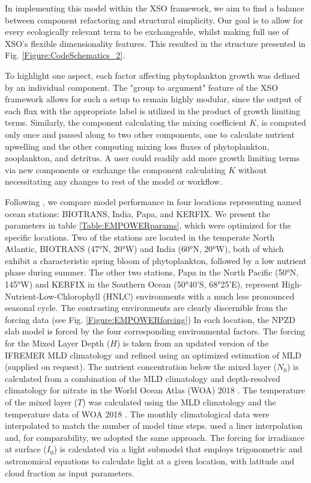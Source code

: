 \documentclass[journal abbreviation, manuscript]{copernicus}
\begin{document}
In implementing this model within the XSO framework, we aim to find a balance between component refactoring and structural simplicity. Our goal is to allow for every ecologically relevant term to be exchangeable, whilst making full use of XSO's flexible dimensionality features. This resulted in the structure presented in Fig. \ref{Figure:CodeSchematics_2}.

To highlight one aspect, each factor affecting phytoplankton growth was defined by an individual component. The "group to argument" feature of the XSO framework allows for such a setup to remain highly modular, since the output of each flux with the appropriate label is utilized in the product of growth limiting terms. 
Similarly, the component calculating the mixing coefficient $K$, is computed only once and passed along to two other components, one to calculate nutrient upwelling and the other computing mixing loss fluxes of phytoplankton, zooplankton, and detritus. A user could readily add more growth limiting terms via new components or exchange the component calculating $K$ without necessitating any changes to rest of the model or workflow.


Following \citet{Anderson2015c}, we compare model performance in four locations representing named ocean stations: BIOTRANS, India, Papa, and KERFIX. We present the parameters in table  \ref{Table:EMPOWERparams}, which were optimized for the specific locations. Two of the stations are located in the temperate North Atlantic, BIOTRANS (47°N, 20°W) and India (60°N, 20°W), both of which exhibit a characteristic spring bloom of phytoplankton, followed by a low nutrient phase during summer. The other two stations, Papa in the North Pacific (50°N, 145°W) and KERFIX in the Southern Ocean (50°40'S, 68°25'E), represent High-Nutrient-Low-Chlorophyll (HNLC) environments with a much less pronounced seasonal cycle. The contrasting environments are clearly discernible from the forcing data (see Fig. \ref{Figure:EMPOWERforcing})
In each location, the NPZD slab model is forced by the four corresponding environmental factors. 
The forcing for the Mixed Layer Depth ($H$) is taken from an updated version of the IFREMER MLD climatology \citep{DeBoyerMontegut2004} and refined using an optimized estimation of MLD (supplied on request).
The nutrient concentration below the mixed layer ($N_0$) is calculated from a combination of the MLD climatology and depth-resolved climatology for nitrate in the World Ocean Atlas (WOA) 2018 \citep{Garcia2019WORLDSilicate}. The temperature of the mixed layer ($T$) was calculated using the MLD climatology and the temperature data of WOA 2018 \citep{Locarnini2019WorldTemperature}. The monthly climatological data were interpolated to match the number of model time steps. \citet{Anderson2015c} used a liner interpolation and, for comparability, we adopted the same approach.
The forcing for irradiance at surface ($I_{0}$) is calculated via a light submodel that employs trigonometric and astronomical equations to calculate light at a given location, with latitude and cloud fraction as input parameters.
\end{document}

